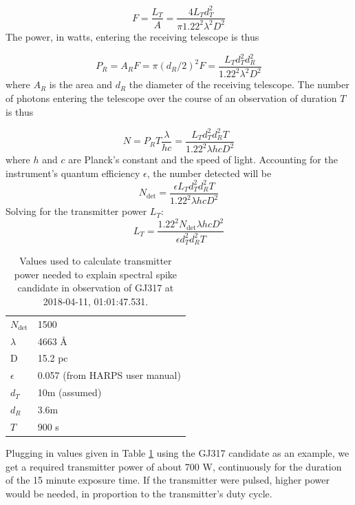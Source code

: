 \documentclass[twocolumn]{aastex701}
\begin{document}
\begin{equation}
    F = \frac{L_T}{A} = \frac{4 L_T d_T^2}{\pi 1.22^2 \lambda^2 D^2}
\end{equation}
The power, in watts, entering the receiving telescope is thus

\begin{equation}
    P_R = A_R F = \pi (d_R/2)^2 F = \frac{L_T d_T^2 d_R^2}{1.22^2 \lambda^2 D^2}
\end{equation}
where $A_R$ is the area and $d_R$ the diameter of the receiving telescope.  The number of photons entering the telescope over the course of an observation of duration $T$ is thus

\begin{equation}
    N = P_R T \frac{\lambda}{h c} = \frac{L_T d_T^2 d_R^2 T}{1.22^2 \lambda h c D^2}
\end{equation}
where $h$ and $c$ are Planck's constant and the speed of light.  Accounting for the instrument's quantum efficiency $\epsilon$, the number detected will be
\begin{equation}
    N_{\mbox{det}} = \frac{\epsilon L_T d_T^2 d_R^2 T}{1.22^2 \lambda h c D^2}
\end{equation}
Solving for the transmitter power $L_T$:
\begin{equation}
    L_T = \frac{1.22^2 N_{\mbox{det}} \lambda h c D^2}{\epsilon d_T^2 d_R^2 T}
\end{equation}

\begin{table}[h]
\begin{tabular}{ll}
$N_{\mbox{det}}$ & 1500\\
$\lambda$ & 4663 \AA \\
D & 15.2 pc \\
$\epsilon$ & 0.057 (from HARPS user manual)\\
$d_T$ & 10m (assumed) \\
$d_R$ & 3.6m \\
$T$ & 900 s\\
\end{tabular}
\label{t:powervalues}
\caption{Values used to calculate transmitter power needed to explain spectral spike candidate in observation of GJ317 at 2018-04-11, 01:01:47.531.}
\end{table}

Plugging in values given in Table \ref{t:powervalues} using the GJ317 candidate as an example, we get a required transmitter power of about 700 W, continuously for the duration of the 15 minute exposure time. If the transmitter were pulsed, higher power would be needed, in proportion to the transmitter's duty cycle. 
\end{document}
